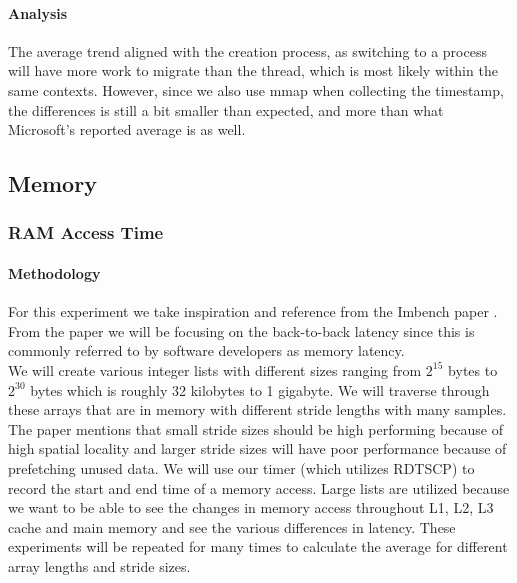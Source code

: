 \paragraph{Analysis}

The average trend aligned with the creation process, as switching to a process will have more work to migrate than the thread, which is most likely within the same contexts. However, since we also use mmap when collecting the timestamp, the differences is still a bit smaller than expected, and more than what Microsoft's reported average is as well.

\subsection{Memory}

\subsubsection{RAM Access Time}


\paragraph{Methodology}

For this experiment we take inspiration and reference from the Imbench paper \cite{mcvoy1996lmbench}. From the paper we will be focusing on the back-to-back latency since this is commonly referred to by software developers as memory latency. \\
We will create various integer lists with different sizes ranging from $2^{15}$ bytes to $2^{30}$ bytes which is roughly 32 kilobytes to 1 gigabyte. We will traverse through these arrays that are in memory with different stride lengths with many samples. The paper mentions that small stride sizes should be high performing because of high spatial locality and larger stride sizes will have poor performance because of prefetching unused data. We will use our timer (which utilizes RDTSCP) to record the start and end time of a memory access. Large lists are utilized because we want to be able to see the changes in memory access throughout L1, L2, L3 cache and main memory and see the various differences in latency. These experiments will be repeated for many times to calculate the average for different array lengths and stride sizes.

